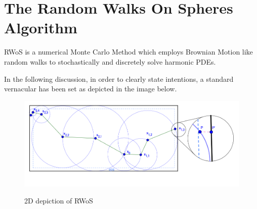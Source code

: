 %
%

\section{The Random Walks On Spheres Algorithm}
\Gls{RWoS} is a numerical Monte Carlo Method which employs Brownian Motion
like random walks to stochastically and discretely solve
harmonic \glspl{PDE}.
\par

In the following discussion, in order to clearly state intentions, a standard
vernacular has been set as depicted in the image below.

\begin{figure}
\includegraphics[width=15.0cm]{styles/WoS} \label{diagram}
  \caption{2D depiction of \Gls{RWoS}}
\end{figure}

